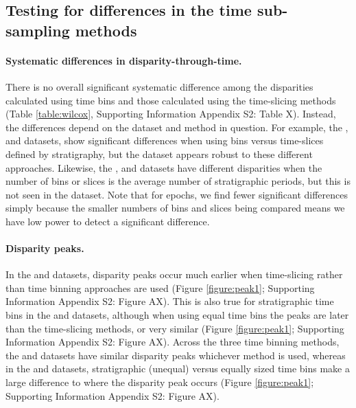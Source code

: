 \documentclass[12pt,a4paper]{article}
\begin{document}
\subsection{Testing for differences in the time sub-sampling methods}

\paragraph{Systematic differences in disparity-through-time.} 
There is no overall significant systematic difference among the disparities calculated using time bins and those calculated using the time-slicing methods (Table \ref{table:wilcox}, Supporting Information Appendix S2: Table X). %
Instead, the differences depend on the dataset and method in question.
For example, the \cite{brusatte2014gradual}, \cite{bapst2016topology} and \cite{wright2017bayesian} datasets, show significant differences when using bins versus time-slices defined by stratigraphy, but the \cite{beckancient2014} dataset appears robust to these different approaches.
Likewise, the \cite{beckancient2014}, \cite{brusatte2014gradual} and \cite{bapst2016topology} datasets have different disparities when the number of bins or slices is the average number of stratigraphic periods, but this is not seen in the \cite{wright2017bayesian} dataset.
Note that for epochs, we find fewer significant differences simply because the smaller numbers of bins and slices being compared means we have low power to detect a significant difference.

    

\paragraph{Disparity peaks.}
In the \cite{beckancient2014} and \cite{brusatte2014gradual} datasets, disparity peaks occur much earlier when time-slicing rather than time binning approaches are used (Figure \ref{figure:peak1}; Supporting Information Appendix S2: Figure AX). %
This is also true for stratigraphic time bins in the \cite{bapst2016topology} and \cite{wright2017bayesian} datasets, although when using equal time bins the peaks are later than the time-slicing methods, or very similar (Figure \ref{figure:peak1}; Supporting Information Appendix S2: Figure AX). %
Across the three time binning methods, the \cite{beckancient2014} and \cite{brusatte2014gradual} datasets have similar disparity peaks whichever method is used, whereas in the \cite{bapst2016topology} and \cite{wright2017bayesian} datasets, stratigraphic (unequal) versus equally sized time bins make a large difference to where the disparity peak occurs (Figure \ref{figure:peak1}; Supporting Information Appendix S2: Figure AX). %
\end{document}
